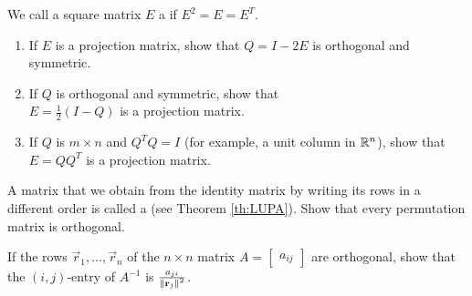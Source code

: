 \documentclass{ximera}
\begin{document}
\begin{problem}\label{prob:ortho20}
We call a square matrix $E$ a  if $E^{2} = E = E^{T}$.


\begin{enumerate} 
\item If $E$ is a projection matrix, show that $Q = I - 2E$ is orthogonal and symmetric.

\item If $Q$ is orthogonal and symmetric, show that \\ $E = \frac{1}{2}(I - Q)$ is a projection matrix.

\item If $Q$ is $m \times n$ and $Q^{T}Q = I$ (for example, a unit column in $\mathbb{R}^n$), show that $E = QQ^{T}$ is a projection matrix.

\end{enumerate}
\end{problem}

\begin{problem}\label{prob:ortho21}
A matrix that we obtain from the identity matrix by writing its rows in a different order is called a  (see Theorem \ref{th:LUPA}). Show that every permutation matrix is orthogonal.
\end{problem}

\begin{problem}\label{prob:ortho22}
If the rows $\vec{r}_{1}, \dots, \vec{r}_{n}$ of the $n \times n$ matrix $A = \begin{bmatrix}
a_{ij}
\end{bmatrix}$ are orthogonal, show that the $(i, j)$-entry of $A^{-1}$ is $\frac{a_{ji}}{\left\lVert\mathbf{r}_{j}\right\rVert^2}$.

\end{problem}
\end{document}
